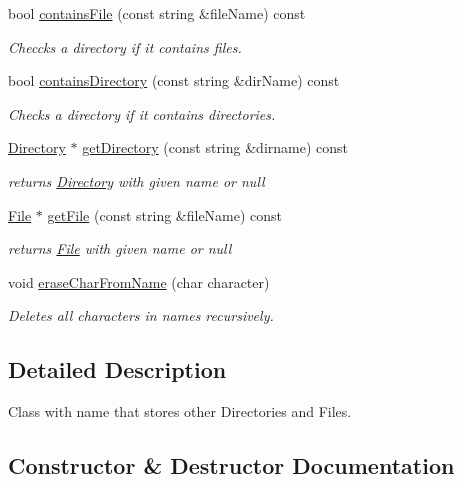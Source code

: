 \begin{DoxyCompactItemize}
bool \hyperlink{class_directory_a0286ef72f0d7cd5a0be7c15c0db46942}{contains\+File} (const string \&file\+Name) const
\begin{DoxyCompactList}\small\item\em Checcks a directory if it contains files. \end{DoxyCompactList}\item 
bool \hyperlink{class_directory_ae84d7cdbbea5138b808dca098c28c820}{contains\+Directory} (const string \&dir\+Name) const
\begin{DoxyCompactList}\small\item\em Checks a directory if it contains directories. \end{DoxyCompactList}\item 
\hyperlink{class_directory}{Directory} $\ast$ \hyperlink{class_directory_a1deb0931a93badb556a4faed75cbc033}{get\+Directory} (const string \&dirname) const
\begin{DoxyCompactList}\small\item\em returns \hyperlink{class_directory}{Directory} with given name or null \end{DoxyCompactList}\item 
\hyperlink{class_file}{File} $\ast$ \hyperlink{class_directory_a3a7c1f0d955b7c3a73f6701db1fdf72b}{get\+File} (const string \&file\+Name) const
\begin{DoxyCompactList}\small\item\em returns \hyperlink{class_file}{File} with given name or null \end{DoxyCompactList}\item 
void \hyperlink{class_directory_ad8718bf810510f06e1932a8083ae09e2}{erase\+Char\+From\+Name} (char character)
\begin{DoxyCompactList}\small\item\em Deletes all characters in names recursively. \end{DoxyCompactList}\end{DoxyCompactItemize}


\subsection{Detailed Description}
Class with name that stores other Directories and Files. 

\subsection{Constructor \& Destructor Documentation}
\mbox{\label{class_directory_a0b019225671a50ead8dbb22b97667676}} 
